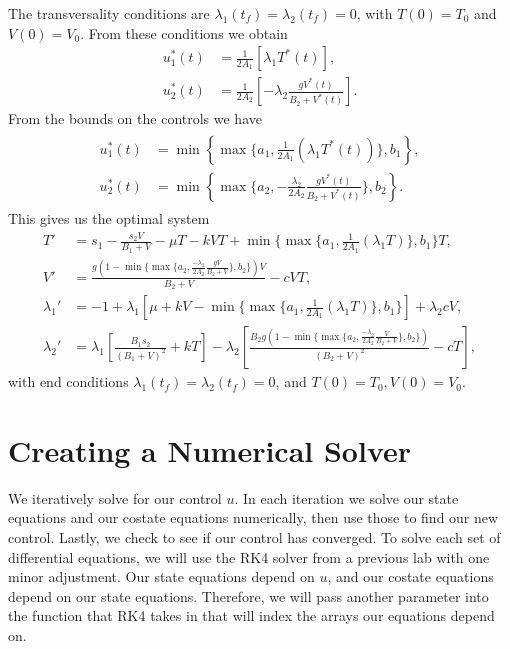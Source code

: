 The transversality conditions are $\lambda_1(t_f)=\lambda_2(t_f)=0$, with $T(0)=T_0$ and $V(0)=V_0$. 
From these conditions we obtain
\begin{align*}
u_1^*(t) &= \frac{1}{2A_1}\left[\lambda_1T^*(t)\right],\\
u_2^*(t) &= \frac{1}{2A_2}\left[-\lambda_2\frac{gV^*(t)}{B_2+V^*(t)}\right].
\end{align*}
From the bounds on the controls we have
\begin{align*}
	\begin{split}
		u_1^*(t)&=\min\left\{\max\{a_1,\frac{1}{2A_1}(\lambda_1T^*(t))\},b_1\right\},\\
		u_2^*(t)&=\min\left\{\max\{a_2,-\frac{\lambda_2}{2A_2}\frac{gV^*(t)}{B_2+V^*(t)}\},b_2\right\}.
	\end{split}
\end{align*}
This gives us the optimal system
\begin{align*}
T'&=s_1-\frac{s_2V}{B_1+V}-\mu T-kVT+\min\{\max\{a_1,\frac{1}{2A_1}(\lambda_1T)\},b_1\}T,\\
V'&=\frac{g(1-\min\{\max\{a_2,\frac{-\lambda_2}{2A_2}\frac{gV}{B_2+V}\},b_2\})V}{B_2+V}-cVT,\\
\lambda_1'&=-1+\lambda_1\left[\mu+kV-\min\{\max\{a_1,\frac{1}{2A_1}(\lambda_1T)\},b_1\}\right]+\lambda_2cV,\\
\lambda_2'&=\lambda_1\left[\frac{B_1s_2}{(B_1+V)^2}+kT\right]-\lambda_2\left[\frac{B_2g(1-\min\{\max\{a_2,\frac{-\lambda_2}{2A_2}\frac{V}{B_2+V}\},b_2\})}{(B_2+V)^2}-cT\right],
\end{align*}
with end conditions $\lambda_1(t_f)=\lambda_2(t_f)=0$, and $T(0)=T_0,V(0)=V_0$.

\section*{Creating a Numerical Solver}

We iteratively solve for our control $u$. In each iteration we solve our state equations and our costate equations numerically, then use those to find our new control. Lastly, we check to see if  our control has converged. To solve each set of differential equations, we will use the RK4 solver from a previous lab with one minor adjustment. Our state equations depend on $u$, and our costate equations depend on our state equations. Therefore, we will pass another parameter into the function that RK4 takes in that will index the arrays our equations depend on.

